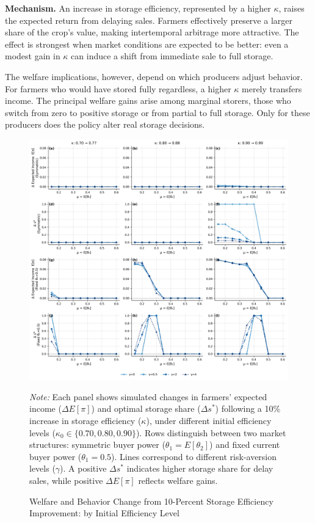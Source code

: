 \textbf{Mechanism.} 
An increase in storage efficiency, represented by a higher $\kappa$, raises the expected return from delaying sales. Farmers effectively preserve a larger share of the crop's value, making intertemporal arbitrage more attractive. The effect is strongest when market conditions are expected to be better: even a modest gain in $\kappa$ can induce a shift from immediate sale to full storage. 

The welfare implications, however, depend on which producers adjust behavior. For farmers who would have stored fully regardless, a higher $\kappa$ merely transfers income. The principal welfare gains arise among marginal storers, those who switch from zero to positive storage or from partial to full storage. Only for these producers does the policy alter real storage decisions.


\begin{figure}[ht!]
    \centering
    \includegraphics[width=\textwidth]{model_figures/individual_storage_efficiency_policy_grid.png}
    \caption{Welfare and Behavior Change from 10-Percent Storage Efficiency Improvement: by Initial Efficiency Level}
    \label{fig: individual storage efficiency improvement}
    \begin{tablenotes}[flushleft]
    \footnotesize
    \item \textit{Note:} 
    Each panel shows simulated changes in farmers' expected income ($\Delta E[\pi]$) and optimal storage share ($\Delta s^*$) following a 10\% increase in storage efficiency ($\kappa$), under different initial efficiency levels ($\kappa_0 \in \{0.70, 0.80, 0.90\}$). 
    Rows distinguish between two market structures: symmetric buyer power ($\theta_1 = E[\theta_2]$) and fixed current buyer power ($\theta_1 = 0.5$). 
    Lines correspond to different risk-aversion levels ($\gamma$). 
    A positive $\Delta s^*$ indicates higher storage share for delay sales, while positive $\Delta E[\pi]$ reflects welfare gains.
    \end{tablenotes}
\end{figure}



